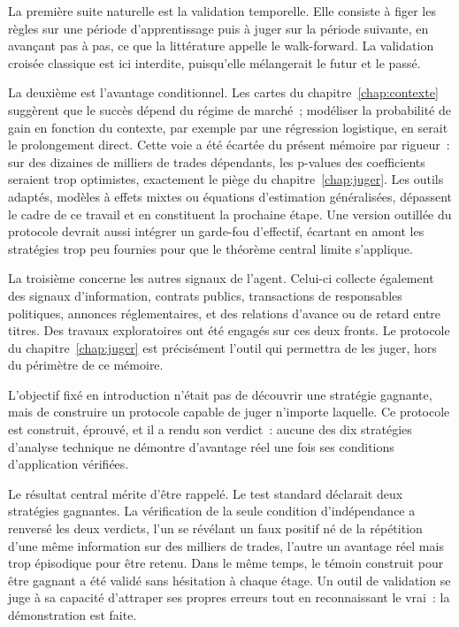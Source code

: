 
La première suite naturelle est la validation temporelle. Elle consiste
à figer les règles sur une période d'apprentissage puis à juger sur la
période suivante, en avançant pas à pas, ce que la littérature appelle
le walk-forward. La validation croisée classique est ici interdite,
puisqu'elle mélangerait le futur et le passé.

La deuxième est l'avantage conditionnel. Les cartes du
chapitre~\ref{chap:contexte} suggèrent que le succès dépend du régime de
marché~; modéliser la probabilité de gain en fonction du contexte, par
exemple par une régression logistique, en serait le prolongement direct.
Cette voie a été écartée du présent mémoire par rigueur~: sur des
dizaines de milliers de trades dépendants, les p-values des coefficients
seraient trop optimistes, exactement le piège du
chapitre~\ref{chap:juger}. Les outils adaptés, modèles à effets mixtes
ou équations d'estimation généralisées, dépassent le cadre de ce
travail et en constituent la prochaine étape. Une version outillée du
protocole devrait aussi intégrer un garde-fou d'effectif, écartant en
amont les stratégies trop peu fournies pour que le théorème central
limite s'applique.

La troisième concerne les autres signaux de l'agent. Celui-ci collecte
également des signaux d'information, contrats publics, transactions de
responsables politiques, annonces réglementaires, et des relations
d'avance ou de retard entre titres. Des travaux exploratoires ont été
engagés sur ces deux fronts. Le protocole du chapitre~\ref{chap:juger}
est précisément l'outil qui permettra de les juger, hors du périmètre de
ce mémoire.



L'objectif fixé en introduction n'était pas de découvrir une stratégie
gagnante, mais de construire un protocole capable de juger n'importe
laquelle. Ce protocole est construit, éprouvé, et il a rendu son
verdict~: aucune des dix stratégies d'analyse technique ne démontre
d'avantage réel une fois ses conditions d'application vérifiées.

Le résultat central mérite d'être rappelé. Le test standard déclarait
deux stratégies gagnantes. La vérification de la seule condition
d'indépendance a renversé les deux verdicts, l'un se révélant un faux
positif né de la répétition d'une même information sur des milliers de
trades, l'autre un avantage réel mais trop épisodique pour être retenu.
Dans le même temps, le témoin construit pour être gagnant a été validé
sans hésitation à chaque étage. Un outil de validation se juge à sa
capacité d'attraper ses propres erreurs tout en reconnaissant le vrai~:
la démonstration est faite.


